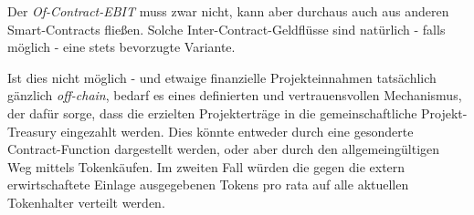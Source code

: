 \vspace{0.3cm}

Der \textit{Of-Contract-EBIT} muss zwar nicht, kann aber durchaus auch aus anderen Smart-Contracts fließen. Solche Inter-Contract-Geldflüsse sind natürlich - falls möglich - eine stets bevorzugte Variante.  

Ist dies nicht möglich - und etwaige finanzielle Projekteinnahmen tatsächlich gänzlich \textit{off-chain}, bedarf es eines definierten und vertrauensvollen Mechanismus, der dafür sorge, dass die erzielten Projekterträge in die gemeinschaftliche Projekt-Treasury eingezahlt werden. Dies könnte entweder durch eine gesonderte Contract-Function dargestellt werden, oder aber durch den allgemeingültigen Weg mittels Tokenkäufen. Im zweiten Fall würden die gegen die extern erwirtschaftete Einlage ausgegebenen Tokens pro rata auf alle aktuellen Tokenhalter verteilt werden. 

\vspace{0.5cm}
